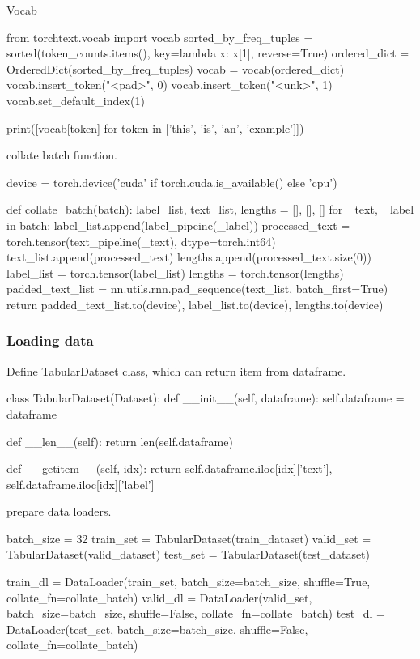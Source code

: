 Vocab
\begin{pythoncode}
from torchtext.vocab import vocab
sorted_by_freq_tuples = sorted(token_counts.items(), key=lambda x: x[1], reverse=True)
ordered_dict = OrderedDict(sorted_by_freq_tuples)
vocab = vocab(ordered_dict)
vocab.insert_token("<pad>", 0)
vocab.insert_token("<unk>", 1)
vocab.set_default_index(1)

print([vocab[token] for token in ['this', 'is', 'an', 'example']])
\end{pythoncode}

collate batch function.
\begin{pythoncode}
device = torch.device('cuda' if torch.cuda.is_available() else 'cpu')

def collate_batch(batch):
    label_list, text_list, lengths = [], [], []
    for _text, _label in batch:
        label_list.append(label_pipeine(_label))
        processed_text = torch.tensor(text_pipeline(_text), dtype=torch.int64)
        text_list.append(processed_text)
        lengths.append(processed_text.size(0))
    label_list = torch.tensor(label_list)
    lengths = torch.tensor(lengths)
    padded_text_list = nn.utils.rnn.pad_sequence(text_list, batch_first=True)
    return padded_text_list.to(device), label_list.to(device), lengths.to(device)
\end{pythoncode}

\subsubsection{Loading data}
Define TabularDataset class, which can return item from dataframe.
\begin{pythoncode}
class TabularDataset(Dataset):
    def __init__(self, dataframe):
        self.dataframe = dataframe
    
    def __len__(self):
        return len(self.dataframe)
    
    def __getitem__(self, idx):
        return self.dataframe.iloc[idx]['text'], self.dataframe.iloc[idx]['label']
\end{pythoncode}

prepare data loaders.
\begin{pythoncode}
batch_size = 32
train_set = TabularDataset(train_dataset)
valid_set = TabularDataset(valid_dataset)
test_set = TabularDataset(test_dataset)

train_dl = DataLoader(train_set, batch_size=batch_size, shuffle=True, collate_fn=collate_batch)
valid_dl = DataLoader(valid_set, batch_size=batch_size, shuffle=False, collate_fn=collate_batch)
test_dl = DataLoader(test_set, batch_size=batch_size, shuffle=False, collate_fn=collate_batch)
\end{pythoncode}

